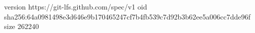 version https://git-lfs.github.com/spec/v1
oid sha256:64a0981498e3d646e9b170465247cf7b4fb539c7d92b3b62ee5a006cc7dde96f
size 262240

